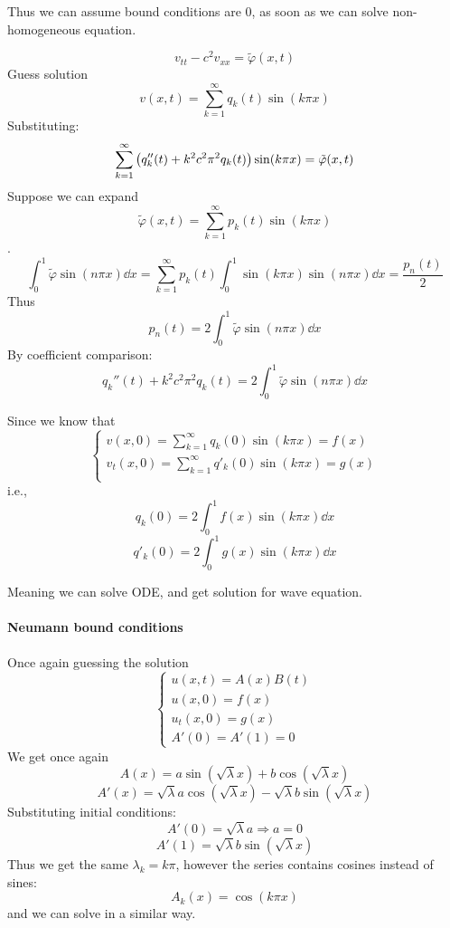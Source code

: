 Thus we can assume bound conditions are $0$, as soon as we can solve non-homogeneous equation.

$$v_{tt} - c^2v_{xx} = \tilde{\varphi}(x,t)$$
Guess solution
$$v(x,t) = \sum_{k=1}^\infty q_k(t) \sin(k\pi x)$$
Substituting:
$$\sum_{k=1}^\infty \qty(q_k''(t) + k^2c^2\pi^2q_k(t)) \sin(k\pi x) = \tilde{\varphi}(x,t)$$
Suppose we can expand $$\tilde{\varphi}(x,t) = \sum_{k=1}^\infty p_k(t)\sin(k \pi x)$$.
$$\int_0^1 \tilde{\varphi} \sin (n\pi x) \dd{x} = \sum_{k=1}^\infty p_k(t) \int_0^1 \sin(k \pi x)\sin (n\pi x) \dd{x} = \frac{p_n(t)}{2}$$
Thus
$$p_n(t) = 2\int_0^1 \tilde{\varphi} \sin (n\pi x) \dd{x} $$
By coefficient comparison:
$$q_k''(t) + k^2c^2\pi^2q_k(t) = 2\int_0^1 \tilde{\varphi} \sin (n\pi x) \dd{x}$$

Since we know that
$$\begin{cases}
v(x,0) = \sum_{k=1}^\infty q_k(0) \sin(k\pi x) = f(x)\\
v_t(x,0) = \sum_{k=1}^\infty q'_k(0) \sin(k\pi x) = g(x)\\
\end{cases}$$
i.e.,
$$q_k(0) = 2\int_0^1 f(x) \sin(k \pi x) \dd{x}$$
$$q'_k(0) = 2\int_0^1 g(x) \sin(k \pi x) \dd{x}$$

Meaning we can solve ODE, and get solution for wave equation.

\paragraph{Neumann bound conditions}
Once again guessing the solution
$$\begin{cases}
u(x,t) = A(x)B(t)\\
u(x,0) = f(x)\\
u_t(x,0)= g(x)\\
A'(0) = A'(1) = 0
\end{cases}$$
We get once again
$$A(x) = a\sin(\sqrt{\lambda}x)+b\cos(\sqrt{\lambda}x)$$
$$A'(x) = \sqrt{\lambda}a\cos(\sqrt{\lambda}x)-\sqrt{\lambda}b\sin(\sqrt{\lambda}x)$$
Substituting initial conditions:
$$A'(0) = \sqrt{\lambda}a \Rightarrow a= 0$$
$$A'(1) = \sqrt{\lambda}b\sin(\sqrt{\lambda}x)$$
Thus we get the same $\lambda_k= k \pi$, however the series contains cosines instead of sines:
$$A_k(x) = \cos(k \pi x)$$
and we can solve in a similar way.